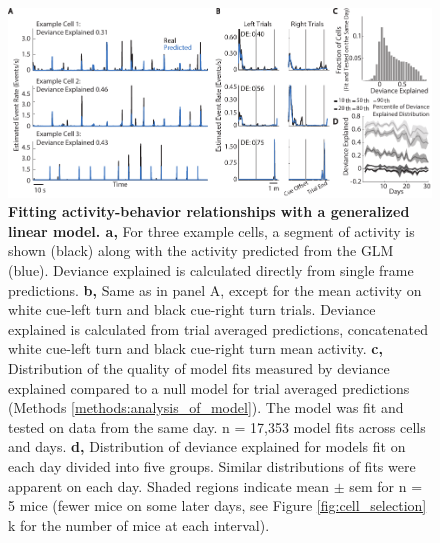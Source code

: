 \begin{figure}
\includegraphics[width=\textwidth]{figures/4_glm_fits.pdf}
\caption[Fitting activity-behavior relationships with a generalized linear model.]{\textbf{Fitting activity-behavior relationships with a generalized linear model. a,} For three example cells, a segment of activity is shown (black) along with the activity predicted from the GLM (blue). Deviance explained is calculated directly from single frame predictions.
%
\textbf{b,} Same as in panel A, except for the mean activity on white cue-left turn and black cue-right turn trials. Deviance explained is calculated from trial averaged predictions, concatenated white cue-left turn and black cue-right turn mean activity.
%
\textbf{c,} Distribution of the quality of model fits measured by deviance explained compared to a null model for trial averaged predictions (Methods \ref{methods:analysis_of_model}). The model was fit and tested on data from the same day. n = 17,353 model fits across cells and days.
%
\textbf{d,} Distribution of deviance explained for models fit on each day divided into five groups. Similar distributions of fits were apparent on each day. Shaded regions indicate mean $\pm$ sem for n = 5 mice (fewer mice on some later days, see Figure \ref{fig:cell_selection} k for the number of mice at each interval).
\label{fig:4_glm_fits}}
\end{figure}

\bigskip

